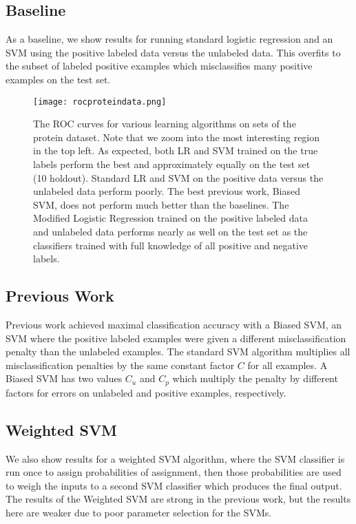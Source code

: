 \documentclass[]{article}
\begin{document}
\subsection{Baseline}

As a baseline, we show results for running standard logistic regression and an SVM using the positive labeled data versus the unlabeled data.  This overfits to the subset of labeled positive examples which misclassifies many positive examples on the test set.


\label{ROC for Protein Dataset}
\begin{figure}[ht!]
\centering
\texttt{[image: rocproteindata.png]}
\caption{The ROC curves for various learning algorithms on sets of the protein dataset.  Note that we zoom into the most interesting region in the top left.  As expected, both LR and SVM trained on the true labels perform the best and approximately equally on the test set (10 holdout). Standard LR and SVM on the positive data versus the unlabeled data perform poorly.  The best previous work, Biased SVM, does not perform much better than the baselines.  The Modified Logistic Regression trained on the positive labeled data and unlabeled data performs nearly as well on the test set as the classifiers trained with full knowledge of all positive and negative labels.}
\end{figure}

\subsection{Previous Work}
Previous work\cite{elkan08} achieved maximal classification accuracy with a Biased SVM, an SVM where the positive labeled examples were given a different misclassification penalty than the unlabeled examples.  The standard SVM algorithm multiplies all misclassification penalties by the same constant factor $C$ for all examples. A Biased SVM has two values $C_u$ and $C_p$ which multiply the penalty by different factors for errors on unlabeled and positive examples, respectively.

\subsection{Weighted SVM}
We also show results for a weighted SVM algorithm, where the SVM classifier is run once to assign probabilities of assignment, then those probabilities are used to weigh the inputs to a second SVM classifier which produces the final output.  The results of the Weighted SVM are strong in the previous work, but the results here are weaker  due to poor parameter selection for the SVMs.
\end{document}
